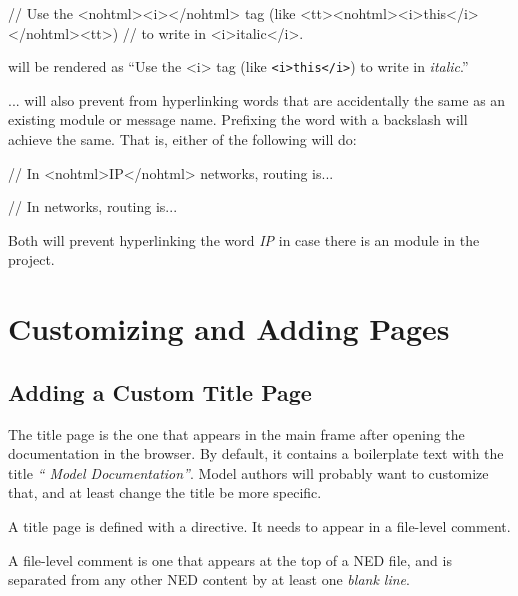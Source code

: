 \begin{ned}
// Use the <nohtml><i></nohtml> tag (like <tt><nohtml><i>this</i></nohtml><tt>)
// to write in <i>italic</i>.
\end{ned}

will be rendered as ``Use the <i> tag (like \texttt{<i>this</i>}) to write
in \textit{italic}.''

... will also prevent 
from hyperlinking words that are accidentally the same as an existing
module or message name. Prefixing the word with a backslash will achieve
the same. That is, either of the following will do:

\begin{ned}
// In <nohtml>IP</nohtml> networks, routing is...
\end{ned}

\begin{ned}
// In \IP networks, routing is...
\end{ned}

Both will prevent hyperlinking the word \textit{IP} in case there is an
 module in the project.



\section{Customizing and Adding Pages}
\label{sec:neddoc:customizing-and-adding-pages}

\subsection{Adding a Custom Title Page}
\label{sec:neddoc:adding-custom-title-page}

The title page is the one that appears in the main frame after opening the
documentation in the browser. By default, it contains a boilerplate text
with the title \textit{``{\opp} Model Documentation''}. Model authors will
probably want to customize that, and at least change the title be more
specific.

A title page is defined with a  directive. It needs to
appear in a file-level comment.

\begin{note}
A file-level comment is one that appears at the top of a NED file, and is
separated from any other NED content by at least one \textit{blank line}.
\end{note}

